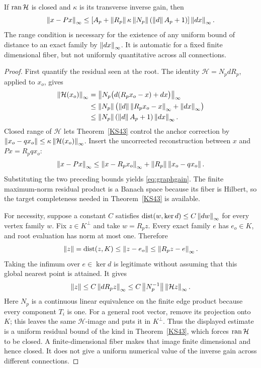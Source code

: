 \begin{theorem}\label{KS44}
If \(\operatorname{ran}\mathcal H\) is closed and \(\kappa\) is its transverse inverse gain, then
\begin{equation}\label{eq:graphgain}
 \left\lVert x-Px\right\rVert_\infty\le
 \left[A_p+\left\lVert R_p\right\rVert\kappa\left\lVert N_p\right\rVert(\left\lVert d\right\rVert A_p+1)\right]
 \left\lVert dx\right\rVert_\infty.
\end{equation}
The range condition is necessary for the existence of any uniform bound of distance to an exact family by \(\left\lVert dx\right\rVert_\infty\). It is automatic for a fixed finite dimensional fiber, but not uniformly quantitative across all connections.
\end{theorem}
\begin{proof}
First quantify the residual seen at the root. The identity \(\mathcal H=N_pdR_p\), applied to \(x_o\), gives
\[
 \begin{aligned}
 \left\lVert\mathcal H(x_o)\right\rVert_\infty
 &=\left\lVert N_p\bigl(d(R_px_o-x)+dx\bigr)\right\rVert_\infty\\
 &\le\left\lVert N_p\right\rVert\bigl(\left\lVert d\right\rVert\left\lVert R_px_o-x\right\rVert_\infty+\left\lVert dx\right\rVert_\infty\bigr)\\
 &\le\left\lVert N_p\right\rVert(\left\lVert d\right\rVert A_p+1)\left\lVert dx\right\rVert_\infty.
 \end{aligned}
\]
Closed range of \(\mathcal H\) lets Theorem~\ref{KS43} control the anchor correction by
\(\left\lVert x_o-qx_o\right\rVert\le\kappa\left\lVert\mathcal H(x_o)\right\rVert_\infty\). Insert the uncorrected reconstruction between \(x\) and \(Px=R_pqx_o\):
\[
 \left\lVert x-Px\right\rVert_\infty
 \le\left\lVert x-R_px_o\right\rVert_\infty+\left\lVert R_p\right\rVert\left\lVert x_o-qx_o\right\rVert.
\]
Substituting the two preceding bounds yields \eqref{eq:graphgain}. The finite maximum-norm residual product is a Banach space because its fiber is Hilbert, so the target completeness needed in Theorem~\ref{KS43} is available.

For necessity, suppose a constant \(C\) satisfies
\(\operatorname{dist}(w,\ker d)\le C\left\lVert dw\right\rVert_\infty\) for every vertex family \(w\). Fix \(z\in K^\perp\) and take \(w=R_pz\). Every exact family \(e\) has \(e_o\in K\), and root evaluation has norm at most one. Therefore
\[
 \left\lVert z\right\rVert=\operatorname{dist}(z,K)\le\left\lVert z-e_o\right\rVert\le\left\lVert R_pz-e\right\rVert_\infty.
\]
Taking the infimum over \(e\in\ker d\) is legitimate without assuming that this global nearest point is attained. It gives
\[
 \left\lVert z\right\rVert\le C\left\lVert dR_pz\right\rVert_\infty
 \le C\left\lVert N_p^{-1}\right\rVert\left\lVert\mathcal Hz\right\rVert_\infty.
\]
Here \(N_p\) is a continuous linear equivalence on the finite edge product because every component \(T_i\) is one. For a general root vector, remove its projection onto \(K\); this leaves the same \(\mathcal H\)-image and puts it in \(K^\perp\). Thus the displayed estimate is a uniform residual bound of the kind in Theorem~\ref{KS43}, which forces \(\operatorname{ran}\mathcal H\) to be closed. A finite-dimensional fiber makes that image finite dimensional and hence closed. It does not give a uniform numerical value of the inverse gain across different connections.
\end{proof}
